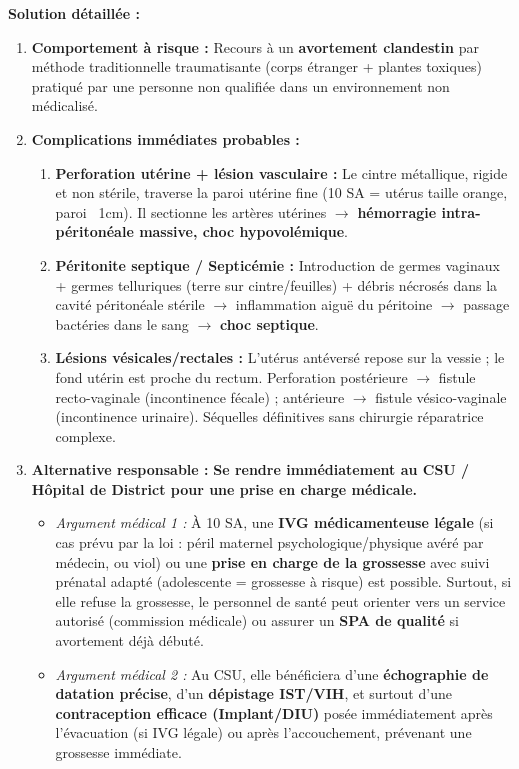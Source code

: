 \documentclass[11pt]{article}
\begin{document}
\begin{exoresolu}
\tcblower
\textbf{Solution détaillée :}
\begin{enumerate}
    \item \textbf{Comportement à risque :} Recours à un \textbf{avortement clandestin} par méthode traditionnelle traumatisante (corps étranger + plantes toxiques) pratiqué par une personne non qualifiée dans un environnement non médicalisé.
    \item \textbf{Complications immédiates probables :}
    \begin{enumerate}
        \item \textbf{Perforation utérine + lésion vasculaire :} Le cintre métallique, rigide et non stérile, traverse la paroi utérine fine (10 SA = utérus taille orange, paroi ~1cm). Il sectionne les artères utérines $\to$ \textbf{hémorragie intra-péritonéale massive, choc hypovolémique}.
        \item \textbf{Péritonite septique / Septicémie :} Introduction de germes vaginaux + germes telluriques (terre sur cintre/feuilles) + débris nécrosés dans la cavité péritonéale stérile $\to$ inflammation aiguë du péritoine $\to$ passage bactéries dans le sang $\to$ \textbf{choc septique}.
        \item \textbf{Lésions vésicales/rectales :} L'utérus antéversé repose sur la vessie ; le fond utérin est proche du rectum. Perforation postérieure $\to$ fistule recto-vaginale (incontinence fécale) ; antérieure $\to$ fistule vésico-vaginale (incontinence urinaire). Séquelles définitives sans chirurgie réparatrice complexe.
    \end{enumerate}
    \item \textbf{Alternative responsable :} \textbf{Se rendre immédiatement au CSU / Hôpital de District pour une prise en charge médicale.}
    \begin{itemize}
        \item \textit{Argument médical 1 :} À 10 SA, une \textbf{IVG médicamenteuse légale} (si cas prévu par la loi : péril maternel psychologique/physique avéré par médecin, ou viol) ou une \textbf{prise en charge de la grossesse} avec suivi prénatal adapté (adolescente = grossesse à risque) est possible. Surtout, si elle refuse la grossesse, le personnel de santé peut orienter vers un service autorisé (commission médicale) ou assurer un \textbf{SPA de qualité} si avortement déjà débuté.
        \item \textit{Argument médical 2 :} Au CSU, elle bénéficiera d'une \textbf{échographie de datation précise}, d'un \textbf{dépistage IST/VIH}, et surtout d'une \textbf{contraception efficace (Implant/DIU)} posée immédiatement après l'évacuation (si IVG légale) ou après l'accouchement, prévenant une grossesse immédiate.

\end{itemize}
\end{enumerate}
\end{exoresolu}
\end{document}
